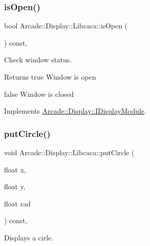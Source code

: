 \mbox{\label{classArcade_1_1Display_1_1Libcaca_aae9aa5b1c54a2086c4fa92e7710fc845}} 
\subsubsection{\texorpdfstring{isOpen()}{isOpen()}}
{\footnotesize\ttfamily bool Arcade\+::\+Display\+::\+Libcaca\+::is\+Open (\begin{DoxyParamCaption}{ }\end{DoxyParamCaption}) const\hspace{0.3cm}{\ttfamily [final]}, {\ttfamily [virtual]}}



Check window status. 

\begin{DoxyReturn}{Returns}
true Window is open 

false Window is closed 
\end{DoxyReturn}


Implements \mbox{\hyperlink{classArcade_1_1Display_1_1IDisplayModule_a34c86dd2e7aa60a70c0cc06ccbd34e47}{Arcade\+::\+Display\+::\+I\+Display\+Module}}.

\mbox{\label{classArcade_1_1Display_1_1Libcaca_a1a718ada53339b195c532fa52600e164}} 
\subsubsection{\texorpdfstring{putCircle()}{putCircle()}}
{\footnotesize\ttfamily void Arcade\+::\+Display\+::\+Libcaca\+::put\+Circle (\begin{DoxyParamCaption}\item[{float}]{x,  }\item[{float}]{y,  }\item[{float}]{rad }\end{DoxyParamCaption}) const\hspace{0.3cm}{\ttfamily [final]}, {\ttfamily [virtual]}}



Displays a cirle. 


